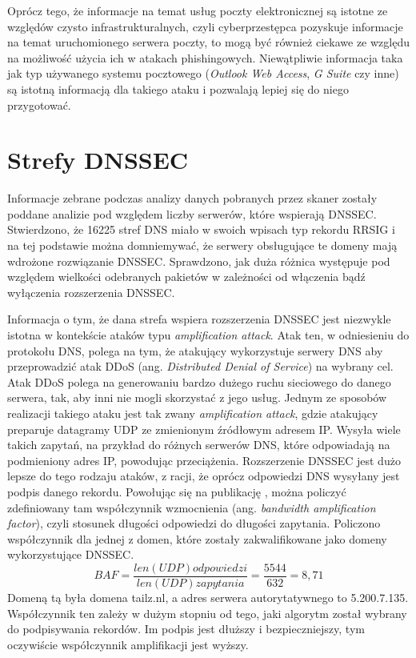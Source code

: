Oprócz tego, że informacje na temat usług poczty elektronicznej są istotne ze względów czysto infrastrukturalnych, czyli cyberprzestępca
pozyskuje informacje na temat uruchomionego serwera poczty, to mogą być również ciekawe ze względu na możliwość użycia ich w atakach
phishingowych. Niewątpliwie informacja taka jak typ używanego systemu pocztowego (\textit{Outlook Web Access}, \textit{G Suite} czy
inne) są istotną informacją dla takiego ataku i pozwalają lepiej się do niego przygotować.

\section{Strefy DNSSEC}
\noindent Informacje zebrane podczas analizy danych pobranych przez skaner zostały poddane analizie pod względem liczby serwerów, które wspierają
DNSSEC. Stwierdzono, że 16225 stref DNS miało w swoich wpisach typ rekordu RRSIG i na tej podstawie można domniemywać, że serwery
obsługujące te domeny mają wdrożone rozwiązanie DNSSEC. Sprawdzono, jak duża różnica występuje pod względem wielkości odebranych
pakietów w zależności od włączenia bądź wyłączenia rozszerzenia DNSSEC.

Informacja o tym, że dana strefa wspiera rozszerzenia DNSSEC jest niezwykle istotna w kontekście ataków typu
\textit{amplification attack}. Atak ten, w odniesieniu do protokołu DNS, polega na tym, że atakujący wykorzystuje serwery DNS aby
przeprowadzić atak DDoS (ang. \textit{Distributed Denial of Service}) na wybrany cel. Atak DDoS polega na generowaniu bardzo dużego
ruchu sieciowego do danego serwera, tak, aby inni nie mogli skorzystać z jego usług. Jednym ze sposobów realizacji takiego ataku
jest tak zwany \textit{amplification attack}, gdzie atakujący preparuje datagramy UDP ze zmienionym źródłowym adresem IP. Wysyła
wiele takich zapytań, na przykład do różnych serwerów DNS, które odpowiadają na podmieniony adres IP, powodując przeciążenia.
Rozszerzenie DNSSEC jest dużo lepsze do tego rodzaju ataków, z racji, że oprócz odpowiedzi DNS wysyłany jest podpis danego rekordu.
Powołując się na publikację \cite{amplification}, można policzyć zdefiniowany tam współczynnik wzmocnienia (ang. \textit{bandwidth
amplification factor}), czyli stosunek
długości odpowiedzi do długości zapytania. Policzono współczynnik dla jednej z domen, które zostały zakwalifikowane jako domeny
wykorzystujące DNSSEC.
$$ BAF=\frac{len(UDP) odpowiedzi}{len(UDP) zapytania}=\frac{5544}{632}=8,71$$
Domeną tą była domena tailz.nl, a adres serwera autorytatywnego to 5.200.7.135. Współczynnik ten zależy w dużym stopniu od tego,
jaki algorytm został wybrany do podpisywania rekordów. Im podpis jest dłuższy i bezpieczniejszy, tym oczywiście współczynnik
amplifikacji jest wyższy.


